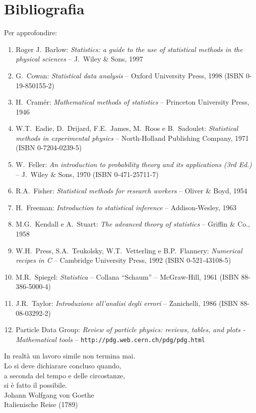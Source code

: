 \documentclass[12pt,a4paper,twoside]{book}
\begin{document}
\chapter{Bibliografia}
\label{ch:g.biblio}
\noindent Per approfondire:
{ \setlength{\leftmargini}{\labelwidth}
  \begin{enumerate}
  \item Roger J.\ Barlow: \textit{Statistics: a guide to the
      use of statistical methods in the physical sciences}
    -- J.\ Wiley \& Sons, 1997
  \item G.\ Cowan: \textit{Statistical data analysis} --
    Oxford University Press, 1998 (ISBN 0-19-850155-2)
  \item H.\ Cram\'er: \textit{Mathematical methods of
      statistics} -- Princeton University Press, 1946
  \item W.T.\ Eadie, D.\ Drijard, F.E.\ James, M.\ Roos e
    B.\ Sadoulet: \textit{Statistical methods in
      experimental physics} -- North-Holland Publishing
    Company, 1971 (ISBN 0-7204-0239-5)
  \item W.\ Feller: \textit{An introduction to probability
      theory and its applications (3rd Ed.)} -- J.\ Wiley \&
    Sons, 1970 (ISBN 0-471-25711-7)
  \item R.A.\ Fisher: \textit{Statistical methods for
      research workers} -- Oliver \& Boyd, 1954
  \item H.\ Freeman: \textit{Introduction to statistical
      inference} -- Addison-Wesley, 1963
  \item M.G.\ Kendall e A.\ Stuart: \textit{The advanced
      theory of statistics} -- Griffin \& Co., 1958
  \item W.H.\ Press, S.A.\ Teukolsky, W.T.\ Vetterling e
    B.P.\ Flannery: \textit{Numerical recipes in C} --
    Cambridge University Press, 1992 (ISBN 0-521-43108-5)
  \item M.R.\ Spiegel: \textit{Statistica} -- Collana
    ``Schaum'' -- McGraw-Hill, 1961 (ISBN 88-386-5000-4)
  \item J.R.\ Taylor: \textit{Introduzione all'analisi degli
      errori} -- Zanichelli, 1986 (ISBN 88-08-03292-2)
  \item Particle Data Group: \textit{Review of particle
      physics: reviews, tables, and plots - Mathematical
      tools} -- \texttt{http://pdg.web.cern.ch/pdg/pdg.html}
  \end{enumerate}
}
%
%
\cleardoublepage
{\markboth{}{}
  \par\vspace*{50mm}\vfill
  \begin{flushright}
    \fontsize{12}{16}\selectfont
    In realt\`a un lavoro simile non termina mai. \\
    Lo si deve dichiarare concluso quando, \\
    a seconda del tempo e delle circostanze, \\
    si \`e fatto il possibile. \\[2ex]
    \fontsize{10}{12}\selectfont
    Johann Wolfgang von Goethe \\
    Italienische Reise (1789) \par
  \end{flushright}}
\cleardoublepage
%
%
\printindex
\end{document}
